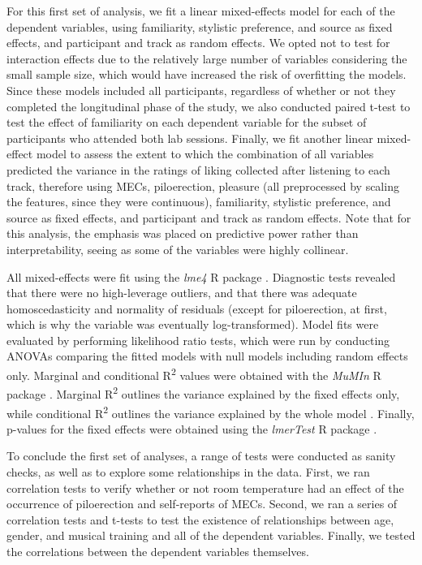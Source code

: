 For this first set of analysis, we fit a linear mixed-effects model for each of the dependent variables, using familiarity, stylistic preference, and source as fixed effects, and participant and track as random effects. We opted not to test for interaction effects due to the relatively large number of variables considering the small sample size, which would have increased the risk of overfitting the models. Since these models included all participants, regardless of whether or not they completed the longitudinal phase of the study, we also conducted paired t-test to test the effect of familiarity on each dependent variable for the subset of participants who attended both lab sessions. Finally, we fit another linear mixed-effect model to assess the extent to which the combination of all variables predicted the variance in the ratings of liking collected after listening to each track, therefore using MECs, piloerection, pleasure (all preprocessed by scaling the features, since they were continuous), familiarity, stylistic preference, and source as fixed effects, and participant and track as random effects. Note that for this analysis, the emphasis was placed on predictive power rather than interpretability, seeing as some of the variables were highly collinear.

All mixed-effects were fit using the \emph{lme4} R package \parencite{bates2015}. Diagnostic tests revealed that there were no high-leverage outliers, and that there was adequate homoscedasticity and normality of residuals (except for piloerection, at first, which is why the variable was eventually log-transformed). Model fits were evaluated by performing likelihood ratio tests, which were run by conducting ANOVAs comparing the fitted models with null models including random effects only. Marginal and conditional R\textsuperscript{2} values were obtained with the \emph{MuMIn} R package \parencite{barton2020}. Marginal R\textsuperscript{2} outlines the variance explained by the fixed effects only, while conditional R\textsuperscript{2} outlines the variance explained by the whole model \parencite{nakagawa2013}. Finally, p-values for the fixed effects were obtained using the \emph{lmerTest} R package \parencite{kuznetsova2017}.

To conclude the first set of analyses, a range of tests were conducted as sanity checks, as well as to explore some relationships in the data. First, we ran correlation tests to verify whether or not room temperature had an effect of the occurrence of piloerection and self-reports of MECs. Second, we ran a series of correlation tests and t-tests to test the existence of relationships between age, gender, and musical training and all of the dependent variables. Finally, we tested the correlations between the dependent variables themselves.

